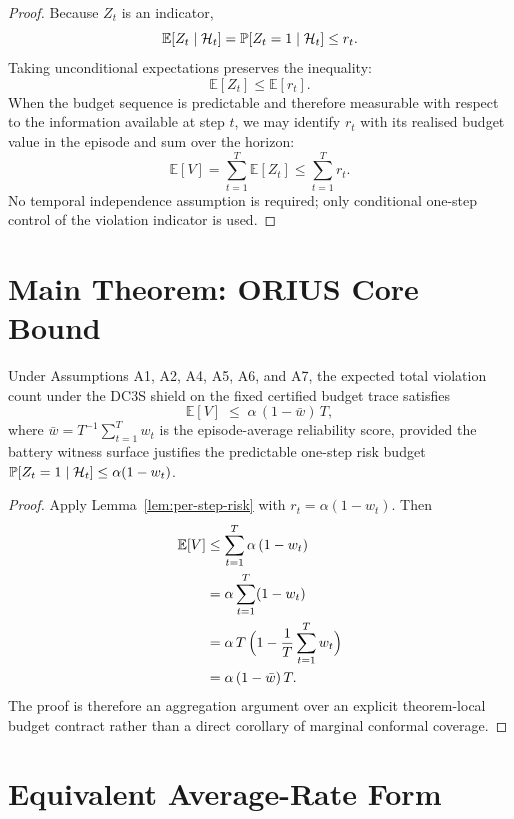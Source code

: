 \begin{proof}
Because $Z_t$ is an indicator,
\[
  \mathbb{E}[Z_t \mid \mathcal{H}_t]
  =
  \operatorname{\mathbb{P}}[Z_t=1 \mid \mathcal{H}_t]
  \le r_t.
\]
Taking unconditional expectations preserves the inequality:
\[
  \mathbb{E}[Z_t] \le \mathbb{E}[r_t].
\]
When the budget sequence is predictable and therefore measurable with respect
to the information available at step $t$, we may identify $r_t$ with its
realised budget value in the episode and sum over the horizon:
\[
  \mathbb{E}[V]
  =
  \sum_{t=1}^T \mathbb{E}[Z_t]
  \le
  \sum_{t=1}^T r_t.
\]
No temporal independence assumption is required; only conditional
one-step control of the violation indicator is used.
\end{proof}

\section{Main Theorem: ORIUS Core Bound}

\begin{theorem}
\label{thm:core-bound}
Under Assumptions A1, A2, A4, A5, A6, and A7, the expected total violation
count under the DC3S shield on the fixed certified budget trace satisfies
\[
  \mathbb{E}[V] \;\le\; \alpha\,(1 - \bar{w})\,T,
\]
where $\bar{w} = T^{-1}\sum_{t=1}^T w_t$ is the episode-average
reliability score, provided the battery witness surface justifies the
predictable one-step risk budget
$\operatorname{\mathbb{P}}[Z_t=1\mid\mathcal{H}_t] \le \alpha(1-w_t)$.
\end{theorem}

\begin{proof}
Apply Lemma~\ref{lem:per-step-risk} with
$r_t = \alpha(1-w_t)$.  Then
\begin{align}
  \mathbb{E}[V]
  &\le \sum_{t=1}^T \alpha\,(1 - w_t) \nonumber \\
  &= \alpha \sum_{t=1}^T (1 - w_t) \nonumber \\
  &= \alpha\,T\,\Bigl(1 - \frac{1}{T}\sum_{t=1}^T w_t\Bigr) \nonumber \\
  &= \alpha\,(1 - \bar{w})\,T. \label{eq:core-bound}
\end{align}
The proof is therefore an aggregation argument over an explicit theorem-local
budget contract rather than a direct corollary of marginal conformal coverage.
\end{proof}

\section{Equivalent Average-Rate Form}

